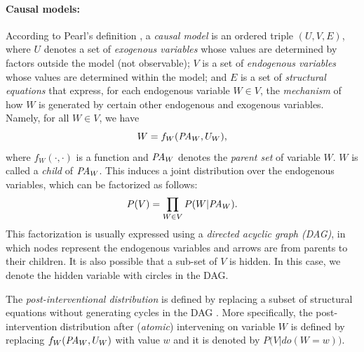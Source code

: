 \documentclass[letterpaper]{article} %
\theoremstyle{definition}%
\theoremstyle{definition}
\newcommand{\defi}{\emph}
\begin{document}
\paragraph{Causal models:}
According to Pearl's definition \cite{pearl2009causality}, a \defi{causal model} is an ordered triple $(U, V, E)$, where $U$ denotes a set of \emph{exogenous variables} whose values are determined by factors outside the model (not observable); $V$ is a set of \emph{endogenous variables} whose values are determined within the model; and $E$ is a set of \emph{structural equations} that express, for each endogenous variable $W \in V$, the \emph{mechanism} of how $W$ is generated by certain other endogenous and exogenous variables. Namely, for all $W\in V$, we have 
$$
W = f_W(\mathit{PA}_W, U_W),
$$
 where $f_W(\cdot,\cdot)$ is a function and $\mathit{PA}_W$ denotes the \defi{parent set} of variable $W$. $W$ is called a \emph{child} of $\mathit{PA}_W$.
This induces a joint distribution over the endogenous variables, which can be factorized as follows:
$$
P(V) = \prod_{W \in V} P(W|\mathit{PA}_W).
$$
This factorization is usually expressed using a \defi{directed acyclic graph (DAG)}, in which nodes represent the endogenous variables and arrows are from parents to their children.
It is also possible that a sub-set of $V$ is hidden. In this case, we denote the hidden variable with circles in the DAG.

The \defi{post-interventional distribution} is defined by replacing a subset of structural equations without generating cycles in the DAG \cite{pearl2009causality}. More specifically, the post-intervention distribution after (\textit{atomic}) intervening on variable $W$ is defined by replacing $f_W(\mathit{PA}_W, U_W)$ with value $w$ and it is denoted by
$
P\big(V| do(W = w)\big).
$
\end{document}

